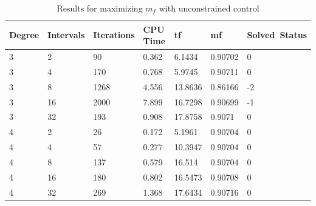 \documentclass[]{article}
\begin{document}
\begin{table}
	\begin{tabular}{lllllll}
		Degree & Intervals & Iterations & CPU Time & tf & mf & Solved\ Status \\ 
		\hline 
		3 & 2 & 90 & 0.362 & 6.1434 & 0.90702 & 0 \\ 
		3 & 4 & 170 & 0.768 & 5.9745 & 0.90711 & 0 \\ 
		3 & 8 & 1268 & 4.556 & 13.8636 & 0.86166 & -2 \\ 
		3 & 16 & 2000 & 7.899 & 16.7298 & 0.90699 & -1 \\ 
		3 & 32 & 193 & 0.908 & 17.8758 & 0.9071 & 0 \\ 
		4 & 2 & 26 & 0.172 & 5.1961 & 0.90704 & 0 \\ 
		4 & 4 & 57 & 0.277 & 10.3947 & 0.90704 & 0 \\ 
		4 & 8 & 137 & 0.579 & 16.514 & 0.90704 & 0 \\ 
		4 & 16 & 180 & 0.802 & 16.5473 & 0.90708 & 0 \\ 
		4 & 32 & 269 & 1.368 & 17.6434 & 0.90716 & 0 \\ 
		\hline 
	\end{tabular}
	\caption{Results for maximizing \(m_f\) with unconstrained control}
	\label{table:2}
\end{table}
\FloatBarrier
\end{document}
